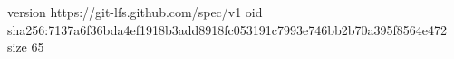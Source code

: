 version https://git-lfs.github.com/spec/v1
oid sha256:7137a6f36bda4ef1918b3add8918fc053191c7993e746bb2b70a395f8564e472
size 65
